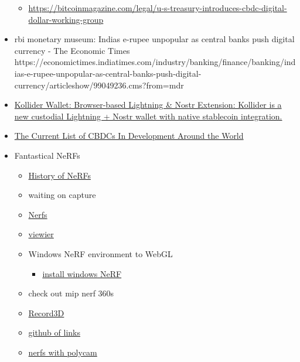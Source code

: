 \begin{itemize}
\begin{itemize}
  \item
    \url{https://bitcoinmagazine.com/legal/u-s-treasury-introduces-cbdc-digital-dollar-working-group}
  \end{itemize}
\item
  rbi monetary museum: India\textquotesingle s e-rupee unpopular as
  central banks push digital currency - The Economic Times
  https://economictimes.indiatimes.com/industry/banking/finance/banking/indias-e-rupee-unpopular-as-central-banks-push-digital-currency/articleshow/99049236.cms?from=mdr
\item
  \href{https://www.nobsbitcoin.com/kollider-wallet/}{Kollider Wallet:
  Browser-based Lightning \& Nostr Extension: Kollider is a new
  custodial Lightning + Nostr wallet with native stablecoin
  integration.}
\item
  \href{https://www.atlanticcouncil.org/cbdctracker/}{The Current List
  of CBDCs In Development Around the World}
\item
  Fantastical NeRFs

  \begin{itemize}
  \item
    \href{https://neuralradiancefields.io/history-of-neural-radiance-fields/}{History
    of NeRFs}
  \item
    waiting on capture
  \item
    \href{https://www.matthewtancik.com/nerf}{Nerfs}
  \item
    \href{https://github.com/sxyu/volrend}{viewier}
  \item
    Windows NeRF environment to WebGL

    \begin{itemize}
     
    \item
      \href{https://github.com/bycloudai/instant-ngp-Windows}{install
      windows NeRF}
    \end{itemize}
  \item
    check out mip nerf 360s
  \item
    \href{https://github.com/marek-simonik/record3d_unity_streaming}{Record3D}
  \item
    \href{https://github.com/yenchenlin/awesome-NeRF}{github of links}
  \item
    \href{https://www.linkedin.com/posts/robcsloan_nerfstudio-nerfstudio-polycam-activity-6999169160379297792-SN4F?utm_source=share\&utm_medium=member_desktop}{nerfs
    with polycam}

    \begin{itemize}
     

\end{itemize}
\end{itemize}
\end{itemize}
